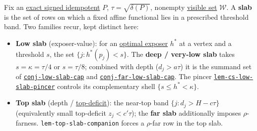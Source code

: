 \hypertarget{def:slab}{}%
\begin{definition}\label{def:slab}
Fix an \hyperref[def:signed-idempotent]{exact signed idempotent} $P$, $\tau=\sqrt{\delta(P)}$,
nonempty \hyperref[def:visible-set]{visible set} $\mathcal W$. A \textbf{slab} is the set of rows on which a fixed
affine functional lies in a prescribed threshold band. Two families recur, kept distinct here:

\begin{itemize}
\item \textbf{Low slab} (exposer-value): for an \hyperref[def:exposed]{optimal exposer} $h^*$ at a vertex and a
threshold $s$, the set $\{j:h^*(p_j)<s\}$. The \textbf{deep / very-low slab} takes $s=\kappa=\tau/4$ or
$s=\tau/8$; combined with depth ($d_j>a\tau$) it is the summand set of \hyperlink{dag:conj-low-slab-cap}{\texttt{conj-\allowbreak{}low-\allowbreak{}slab-\allowbreak{}cap}} and
\hyperlink{dag:conj-far-low-slab-cap}{\texttt{conj-\allowbreak{}far-\allowbreak{}low-\allowbreak{}slab-\allowbreak{}cap}}. The pincer \hyperlink{dag:lem-cs-low-slab-pincer}{\texttt{lem-\allowbreak{}cs-\allowbreak{}low-\allowbreak{}slab-\allowbreak{}pincer}} controls its complementary shell
$\{s\le h^*<\kappa\}$.
\item \textbf{Top slab} (depth / \hyperref[def:top-deficit]{top-deficit}): the near-top band
$\{j:d_j>H-c\tau\}$ (equivalently small top-deficit $z_j<c'\tau$); the \textbf{far slab} additionally
imposes $\rho$-farness. \texttt{lem-\allowbreak{}top-\allowbreak{}slab-\allowbreak{}companion} forces a $\rho$-far row in the top slab.
\end{itemize}
\end{definition}
